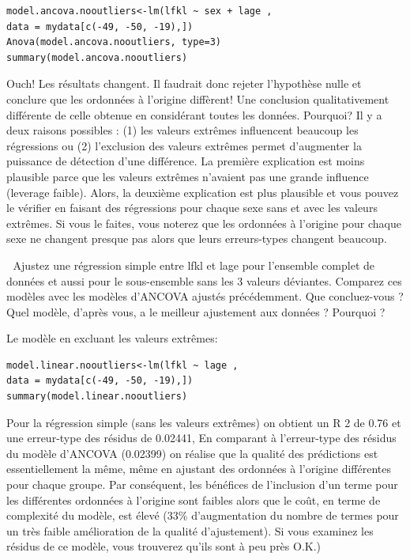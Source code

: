 \documentclass[12pt,]{book}
\begin{document}
\begin{verbatim}
model.ancova.nooutliers<-lm(lfkl ~ sex + lage ,
data = mydata[c(-49, -50, -19),])
Anova(model.ancova.nooutliers, type=3)
summary(model.ancova.nooutliers)
\end{verbatim}

Ouch! Les résultats changent. Il faudrait donc rejeter l'hypothèse nulle
et conclure que les ordonnées à l'origine diffèrent! Une conclusion
qualitativement différente de celle obtenue en considérant toutes les
données. Pourquoi? Il y a deux raisons possibles : (1) les valeurs
extrêmes influencent beaucoup les régressions ou (2) l'exclusion des
valeurs extrêmes permet d'augmenter la puissance de détection d'une
différence. La première explication est moins plausible parce que les
valeurs extrêmes n'avaient pas une grande influence (leverage faible).
Alors, la deuxième explication est plus plausible et vous pouvez le
vérifier en faisant des régressions pour chaque sexe sans et avec les
valeurs extrêmes. Si vous le faites, vous noterez que les ordonnées à
l'origine pour chaque sexe ne changent presque pas alors que leurs
erreurs-types changent beaucoup.

 Ajustez une régression simple entre lfkl et lage pour l'ensemble complet de données et aussi pour le sous-ensemble sans les 3 valeurs déviantes. Comparez ces modèles avec les modèles d'ANCOVA ajustés
précédemment. Que concluez-vous ? Quel modèle, d'après vous, a le
meilleur ajustement aux données ? Pourquoi ?

Le modèle en excluant les valeurs extrêmes:

\begin{verbatim}
model.linear.nooutliers<-lm(lfkl ~ lage ,
data = mydata[c(-49, -50, -19),])
summary(model.linear.nooutliers)
\end{verbatim}

Pour la régression simple (sans les valeurs extrêmes) on obtient un R 2
de 0.76 et une erreur-type des résidus de 0.02441, En comparant à
l'erreur-type des résidus du modèle d'ANCOVA (0.02399) on réalise
que la qualité des prédictions est essentiellement la même, même en
ajustant des ordonnées à l'origine différentes pour chaque groupe. Par
conséquent, les bénéfices de l'inclusion d'un terme pour les différentes ordonnées à l'origine sont faibles alors que le coût, en terme de complexité du modèle, est élevé (33\% d'augmentation du
nombre de termes pour un très faible amélioration de la qualité
d'ajustement). Si vous examinez les résidus de ce modèle, vous
trouverez qu'ils sont à peu près O.K.)
\end{document}
